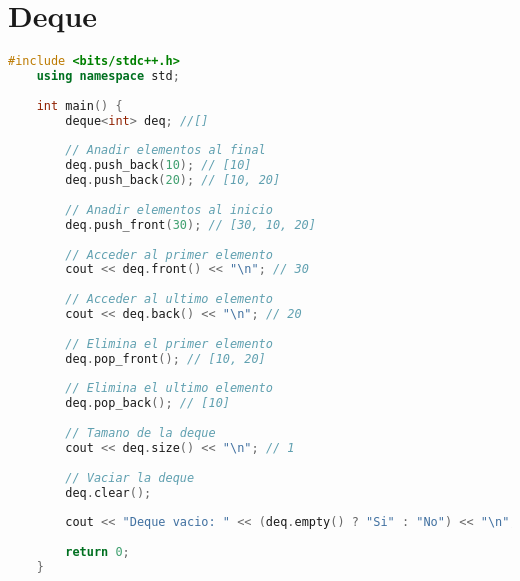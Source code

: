 
\section*{Deque}

\begin{lstlisting}[language=C++]
	#include <bits/stdc++.h>
	using namespace std;
	
	int main() {
		deque<int> deq; //[]
		
		// Anadir elementos al final 
		deq.push_back(10); // [10]
		deq.push_back(20); // [10, 20]
		
		// Anadir elementos al inicio
		deq.push_front(30); // [30, 10, 20]
		
		// Acceder al primer elemento 
		cout << deq.front() << "\n"; // 30
		
		// Acceder al ultimo elemento 
		cout << deq.back() << "\n"; // 20
		
		// Elimina el primer elemento 
		deq.pop_front(); // [10, 20]
		
		// Elimina el ultimo elemento 
		deq.pop_back(); // [10]
		
		// Tamano de la deque
		cout << deq.size() << "\n"; // 1
		
		// Vaciar la deque
		deq.clear();
		
		cout << "Deque vacio: " << (deq.empty() ? "Si" : "No") << "\n";
		
		return 0;
	}
\end{lstlisting}
